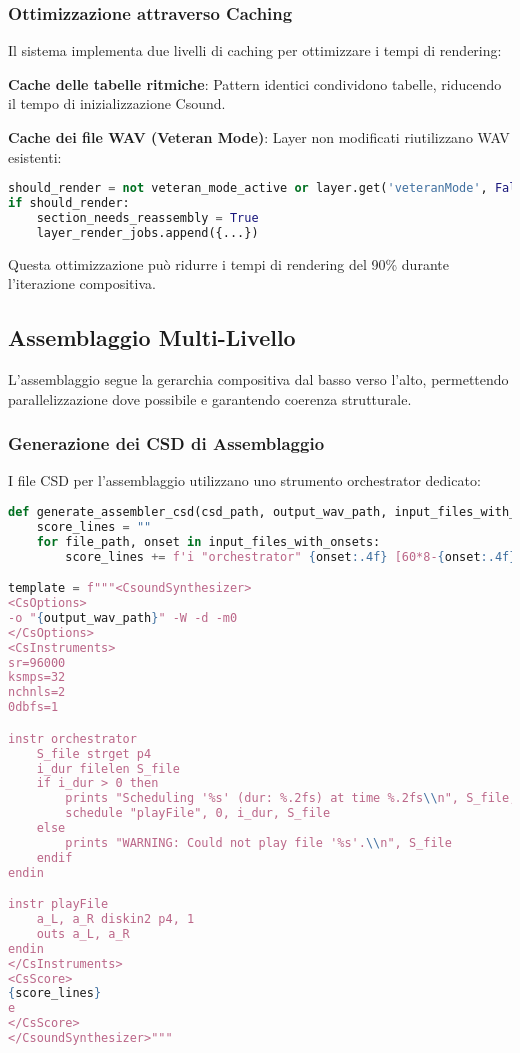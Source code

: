 \subsubsection{Ottimizzazione attraverso Caching}
Il sistema implementa due livelli di caching per ottimizzare i tempi di rendering:

\textbf{Cache delle tabelle ritmiche}: Pattern identici condividono tabelle, riducendo il tempo di inizializzazione Csound.

\textbf{Cache dei file WAV (Veteran Mode)}: Layer non modificati riutilizzano WAV esistenti:

\begin{lstlisting}[language=Python]
should_render = not veteran_mode_active or layer.get('veteranMode', False)
if should_render:
    section_needs_reassembly = True
    layer_render_jobs.append({...})
\end{lstlisting}

Questa ottimizzazione può ridurre i tempi di rendering del 90\% durante l'iterazione compositiva.
\subsection{Assemblaggio Multi-Livello}
L'assemblaggio segue la gerarchia compositiva dal basso verso l'alto, permettendo parallelizzazione dove possibile e garantendo coerenza strutturale.
\subsubsection{Generazione dei CSD di Assemblaggio}
I file CSD per l'assemblaggio utilizzano uno strumento orchestrator dedicato:

\begin{lstlisting}[language=Python]
def generate_assembler_csd(csd_path, output_wav_path, input_files_with_onsets, title="Assembler"):
    score_lines = ""
    for file_path, onset in input_files_with_onsets:
        score_lines += f'i "orchestrator" {onset:.4f} [60*8-{onset:.4f}] "{file_path}"\n'

template = f"""<CsoundSynthesizer>
<CsOptions>
-o "{output_wav_path}" -W -d -m0
</CsOptions>
<CsInstruments>
sr=96000
ksmps=32
nchnls=2
0dbfs=1

instr orchestrator
    S_file strget p4
    i_dur filelen S_file
    if i_dur > 0 then
        prints "Scheduling '%s' (dur: %.2fs) at time %.2fs\\n", S_file, i_dur, p2
        schedule "playFile", 0, i_dur, S_file
    else
        prints "WARNING: Could not play file '%s'.\\n", S_file
    endif
endin

instr playFile
    a_L, a_R diskin2 p4, 1
    outs a_L, a_R
endin
</CsInstruments>
<CsScore>
{score_lines}
e
</CsScore>
</CsoundSynthesizer>"""
\end{lstlisting}

